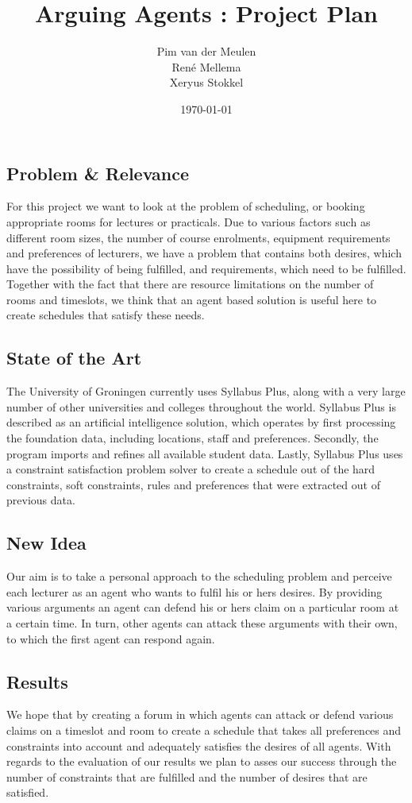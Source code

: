 \documentclass[a4paper]{article}
\title{\textsf{Arguing Agents :} Project Plan}
\author{Pim van der Meulen \\Ren\'e Mellema \\Xeryus Stokkel}
\date{\today}
\begin{document}
\maketitle

\subsection*{Problem \& Relevance}
For this project we want to look at the problem of scheduling, or booking appropriate rooms for lectures or practicals. Due to various factors such as different room sizes, the number of course enrolments, equipment requirements and preferences of lecturers, we have a problem that contains both desires, which have the possibility of being fulfilled, and requirements, which need to be fulfilled. Together with the fact that there are resource limitations on the number of rooms and timeslots, we think that an agent based solution is useful here to create schedules that satisfy these needs.      
 
\subsection*{State of the Art}
The University of Groningen currently uses Syllabus Plus, along with a very large number of other universities and colleges throughout the world. Syllabus Plus is described as an artificial intelligence solution, which operates by first processing the foundation data, including locations, staff and preferences. Secondly, the program imports and refines all available student data. Lastly, Syllabus Plus uses a constraint satisfaction problem solver to create a schedule out of the hard constraints, soft constraints, rules and preferences that were extracted out of previous data.  

\subsection*{New Idea}
Our aim is to take a personal approach to the scheduling problem and perceive each lecturer as an agent who wants to fulfil his or hers desires. By providing various arguments an agent can defend his or hers claim on a particular room at a certain time. In turn, other agents can attack these arguments with their own, to which the first agent can respond again. 

\subsection*{Results}
We hope that by creating a forum in which agents can attack or defend various claims on a timeslot and room to create a schedule that takes all preferences and constraints into account and adequately satisfies the desires of all agents. With regards to the evaluation of our results we plan to asses our success through the number of constraints that are fulfilled and the number of desires that are satisfied.
\end{document}
